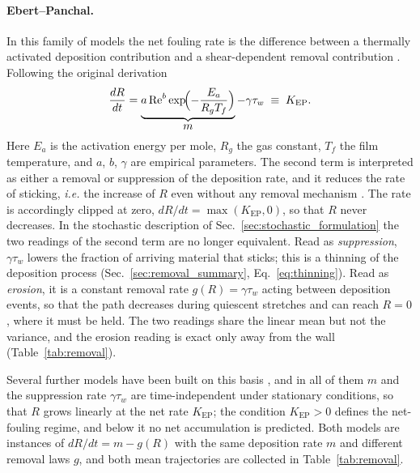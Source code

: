 \documentclass[preprint,12pt]{elsarticle}
\begin{document}
\paragraph*{Ebert--Panchal.} 
In this family of models the net fouling rate is the 
difference between
a thermally activated deposition contribution and a shear-dependent 
removal contribution \cite{Wilson24052017}. 
Following the original derivation
\begin{equation}
  \frac{dR}{dt}=\underbrace{a\,\mathrm{Re}^{b}\exp\!\Bigl(-\frac{E_a}{R_gT_f}\Bigr)}_{\displaystyle m}
  -\gamma\tau_w\;\equiv\;K_{\mathrm{EP}} .
  \label{eq:ebert_panchal_rate}
\end{equation}
Here $E_a$ is the activation energy per mole, $R_g$ the gas constant,
$T_f$ the film temperature, and $a$, $b$, $\gamma$ are empirical 
parameters.
The second term is interpreted as either a removal or suppression of the
deposition rate, and it reduces the rate of sticking, \emph{i.e.} 
the increase of $R$ even without any removal mechanism 
\cite{EP5,Diaz-Bejarano24052017}. 
The rate is accordingly clipped at zero,
$dR/dt=\max(K_{\mathrm{EP}},0)$, so that $R$ never decreases.
In the stochastic description of Sec.~\ref{sec:stochastic_formulation}
the two readings of the second term are no longer equivalent. Read as
\emph{suppression}, $\gamma\tau_w$ lowers the fraction of arriving material
that sticks; this is a thinning of the deposition process
(Sec.~\ref{sec:removal_summary}, Eq.~\eqref{eq:thinning}).
Read as \emph{erosion}, it is a constant removal rate
$g(R)=\gamma\tau_w$ acting between deposition events, so that the path
decreases during quiescent stretches and can reach $R=0$, where it must be
held. The two readings share the linear mean but not the variance, and the
erosion reading is exact only away from the wall
(Table~\ref{tab:removal}).

Several further models have been built on this basis
\cite{EP4,EP6,EP3,EP2,EP1}, and in all of them $m$ and the suppression rate
$\gamma\tau_w$ are time-independent under stationary conditions, so that $R$
grows linearly at the net rate $K_{\mathrm{EP}}$; the condition
$K_{\mathrm{EP}}>0$ defines the net-fouling regime, and below it no net
accumulation is predicted. Both models are instances of $dR/dt=m-g(R)$ with
the same deposition rate $m$ and different removal laws $g$, and both mean
trajectories are collected in Table~\ref{tab:removal}.
\end{document}
